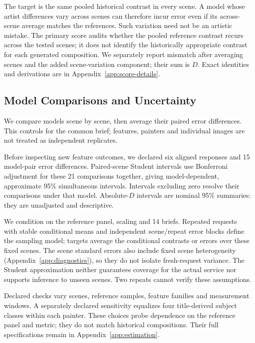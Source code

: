 The target is the same pooled historical contrast in every scene. A model
whose artist differences vary across scenes can therefore incur error even
if its across-scene average matches the references. Such variation need not
be an artistic mistake. The primary score audits whether the pooled reference
contrast recurs across the tested scenes; it does not identify the historically
appropriate contrast for each generated composition. We separately report mismatch after averaging scenes
and the added scene-variation component; their sum is $D$. Exact identities
and derivations are in Appendix~\ref{app:score-details}.

\subsection{Model Comparisons and Uncertainty}
We compare models scene by scene, then average their paired error differences.
This controls for the common brief; features, painters and individual images
are not treated as independent replicates.

Before inspecting new feature outcomes, we declared six aligned responses and
15 model-pair error differences. Paired-scene Student intervals use Bonferroni
adjustment for these 21 comparisons together, giving model-dependent,
approximate 95\% simultaneous intervals. Intervals excluding zero resolve
their comparisons under that model.
Absolute-$D$ intervals are nominal 95\% summaries: they are unadjusted and descriptive.

We condition on the reference panel, scaling and 14 briefs. Repeated requests
with stable conditional means and independent scene/repeat error blocks define
the sampling model; targets average the conditional contrasts or errors over
these fixed scenes. The scene standard errors also include fixed scene
heterogeneity (Appendix~\ref{app:diagnostics}), so they do not isolate
fresh-request variance. The Student approximation neither guarantees coverage
for the actual service nor supports inference to unseen scenes. Two repeats
cannot verify these assumptions.

Declared checks vary scenes, reference samples, feature families and measurement
windows. A separately declared sensitivity equalizes four title-derived subject
classes within each painter. These choices probe dependence on the reference
panel and metric; they do not match historical compositions. Their full
specifications remain in Appendix~\ref{app:estimation}.

